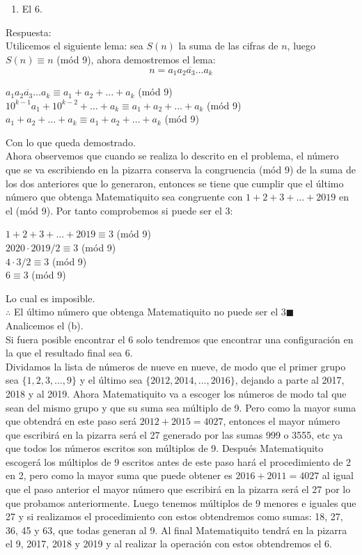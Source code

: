 \documentclass{book}
\begin{document}
\begin{enumerate}
\begin{enumerate}
            \item El 6.
        \end{enumerate}
        Respuesta:\\
        Utilicemos el siguiente lema: sea $S(n)$ la suma de las cifras de $n$, luego $S(n)\equiv n$ (mód 9), ahora demostremos el lema:
        $$n=\overline{a_1a_2a_3\ldots a_k}$$
        \begin{center}
            $\overline{a_1a_2a_3\ldots a_k}\equiv a_1+a_2+\ldots +a_k$ (mód 9)\\
            $10^{k-1}a_1+10^{k-2}+\ldots+a_k\equiv a_1+a_2+\ldots +a_k$ (mód 9)\\
            $a_1+a_2+\ldots +a_k\equiv a_1+a_2+\ldots +a_k$ (mód 9)
        \end{center}
        Con lo que queda demostrado.\\
        Ahora observemos que cuando se realiza lo descrito en el problema, el número que se va escribiendo en la pizarra conserva la congruencia (mód 9) de la suma de los dos anteriores que lo generaron, entonces se tiene que cumplir que el último número que obtenga Matematiquito sea congruente con $1+2+3+\ldots+2019$ en el (mód 9). Por tanto comprobemos si puede ser el 3:
        \begin{center}
            $1+2+3+\ldots+2019\equiv 3$ (mód 9)\\
            $2020\cdot 2019/2\equiv 3$ (mód 9)\\
            $4\cdot 3/2\equiv 3$ (mód 9)\\
            $6\equiv 3$ (mód 9)\\
        \end{center}
        Lo cual es imposible.\\
        $\therefore$ El último número que obtenga Matematiquito no puede ser el 3$\blacksquare$\\
        Analicemos el (b).\\
        Si fuera posible encontrar el 6 solo tendremos que encontrar una configuración en la que el resultado final sea 6.\\
        Dividamos la lista de números de nueve en nueve, de modo que el primer grupo sea $\{1, 2, 3, \ldots, 9\}$ y el último sea $\{2012, 2014 ,\ldots , 2016\}$, dejando a parte al 2017, 2018 y al 2019. Ahora Matematiquito va a escoger los números de modo tal que sean del mismo grupo y que su suma sea múltiplo de 9. Pero como la mayor suma que obtendrá en este paso será $2012+2015=4027$, entonces el mayor número que escribirá en la pizarra será el 27 generado por las sumas 999 o 3555, etc ya que todos los números escritos son múltiplos de 9. Después Matematiquito escogerá los múltiplos de 9 escritos antes de este paso hará el procedimiento de 2 en 2, pero como la mayor suma que puede obtener es $2016+2011=4027$ al igual que el paso anterior el mayor número que escribirá en la pizarra será el 27 por lo que probamos anteriormente. Luego tenemos múltiplos de 9 menores e iguales que 27 y si realizamos el procedimiento con estos obtendremos como sumas: 18, 27, 36, 45 y 63, que todas generan al 9. Al final Matematiquito tendrá en la pizarra el 9, 2017, 2018 y 2019 y al realizar la operación con estos obtendremos el 6.\\

\end{enumerate}
\end{document}
